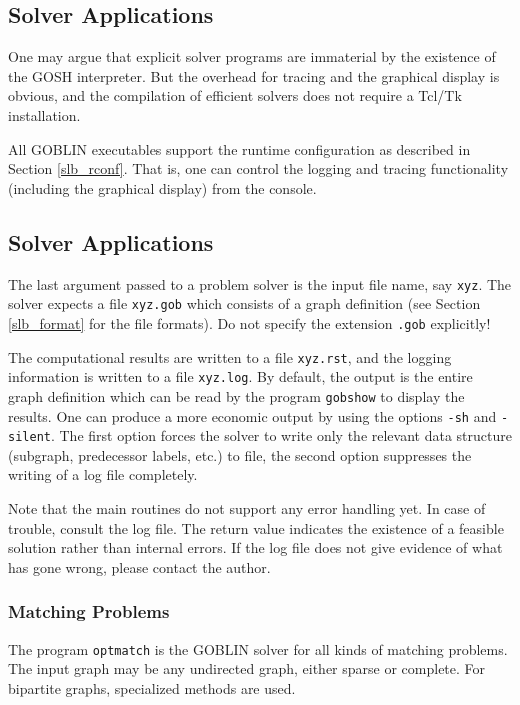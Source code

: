 \documentclass[a4paper,11pt,twoside]{book}
\begin{document}
\cleardoublepage
\begin{multicols}{2}
\chapter{Solver Applications}
\thispagestyle{fancy}
\label{clb13}
One may argue that explicit solver programs are immaterial by the existence of
the GOSH interpreter. But the overhead for tracing and the graphical display 
is obvious, and the compilation of efficient solvers does not require a Tcl/Tk
installation.

All GOBLIN executables support the runtime configuration as described in
Section \ref{slb_rconf}. That is, one can control the logging and tracing
functionality (including the graphical display) from the console. 


\section{Solver Applications}
The last argument passed to a problem solver is the input file name, say
\verb/xyz/. The solver expects a file \verb/xyz.gob/ which
consists of a graph definition (see Section \ref{slb_format} for the file
formats). Do not specify the extension \verb/.gob/ explicitly!

The computational results are written to a file \verb/xyz.rst/, and the logging
information is written to a file \verb/xyz.log/. By default, the output is the
entire graph definition which can be read by the program \verb/gobshow/ to
display the results. One can produce a more economic output by using the
options \verb/-sh/ and \verb/-silent/. The first option forces the solver to
write only the relevant data structure (subgraph, predecessor labels, etc.)
to file, the second option suppresses the writing of a log file completely.

Note that the main routines do not support any error handling yet.
In case of trouble, consult the log file. The return value indicates the
existence of a feasible solution rather than internal errors. If the log file
does not give evidence of what has gone wrong, please contact the author.



\subsection{Matching Problems}
The program \verb/optmatch/ is the GOBLIN solver for all kinds of matching
problems. The input graph may be any undirected graph, either sparse or
complete. For bipartite graphs, specialized methods are used.


\end{multicols}
\end{document}
